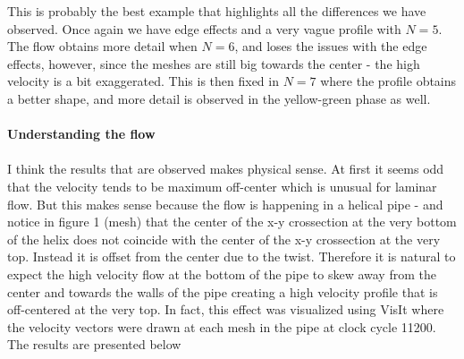 \documentclass[12pt]{article}
\begin{document}
This is probably the best example that highlights all the differences we have observed. Once again we have edge effects and a very vague profile with $N=5$. The flow obtains more detail when $N=6$, and loses the issues with the edge effects, however, since the meshes are still big towards the center - the high velocity is a bit exaggerated. This is then fixed in $N=7$ where the profile obtains a better shape, and more detail is observed in the yellow-green phase as well. \\\\

\noindent \textbf{Understanding the flow}\\\\
I think the results that are observed makes physical sense. At first it seems odd that the velocity tends to be maximum off-center which is unusual for laminar flow. But this makes sense because the flow is happening in a helical pipe - and notice in figure 1 (mesh) that the center of the x-y crossection at the very bottom of the helix does not coincide with the center of the x-y crossection at the very top. Instead it is offset from the center due to the twist. Therefore it is natural to expect the high velocity flow at the bottom of the pipe to skew away from the center and towards the walls of the pipe creating a high velocity profile that is off-centered at the very top. In fact, this effect was visualized using VisIt where the velocity vectors were drawn at each mesh in the pipe at clock cycle 11200. The results are presented below\\\\
\end{document}
